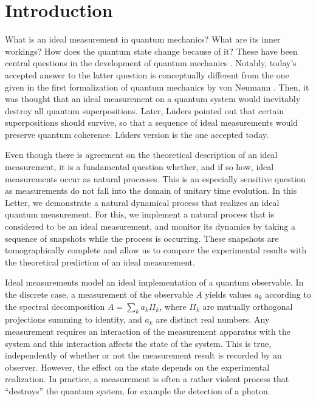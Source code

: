 \documentclass[12pt,
onecolumn,
superscriptaddress,
floatfix,
]{revtex4-2}
\begin{document}
\maketitle
\newpage

\section{Introduction}

What is an ideal measurement in quantum mechanics?
What are its inner workings?
How does the quantum state change because of it?
These have been central questions in the development of quantum mechanics 
 \cite{WZ83}.
Notably, today's accepted answer to the latter question is conceptually 
 different from the one given in the first formalization of quantum mechanics 
 by von Neumann \cite{vonNeumann32}.
Then, it was thought that an ideal measurement on a quantum system would 
 inevitably destroy all quantum superpositions.
Later, Lüders pointed out \cite{Luders51} that certain superpositions should 
 survive, so that a sequence of ideal measurements would preserve quantum 
 coherence.
Lüders version is the one accepted today.

Even though there is agreement on the theoretical description of an ideal 
 measurement, it is a fundamental question whether, and if so how, ideal 
 measurements occur as natural processes.
This is an especially sensitive question as measurements do not fall into the 
 domain of unitary time evolution.
In this Letter, we demonstrate a natural dynamical process that realizes an 
 ideal quantum measurement.
For this, we implement a natural process that is considered to be an ideal 
 measurement, and monitor its dynamics by taking a sequence of snapshots while 
 the process is occurring.
These snapshots are tomographically complete and allow us to compare the 
 experimental results with the theoretical prediction of an ideal measurement.
 
Ideal measurements model an ideal implementation of a quantum observable.
In the discrete case, a measurement of the observable $A$ yields values $a_k$ 
 according to the spectral decomposition $A= \sum_k a_k \Pi_k$, where $\Pi_k$ 
 are mutually orthogonal projections summing to identity, and $a_k$ are distinct real 
 numbers.
Any measurement requires an interaction of the measurement apparatus with the 
 system and this interaction affects the state of the system.
This is true, independently of whether or not the measurement result is 
 recorded by an observer.
However, the effect on the state depends on the experimental realization.
In practice, a measurement is often a rather violent process that ``destroys'' 
 the quantum system, for example the detection of a photon. 
\end{document}
